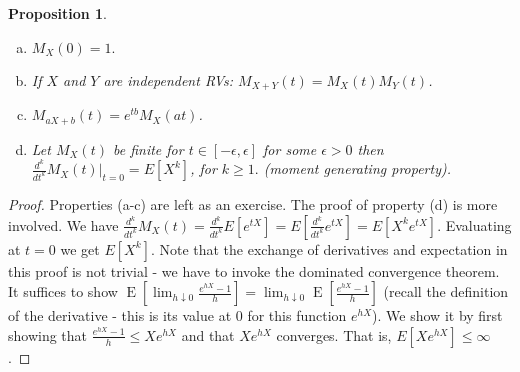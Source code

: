 \documentclass{book}
\theoremstyle{plain}%
\newtheorem{proposition}{Proposition}[section]
\theoremstyle{definition}
\DeclareMathOperator{\E}{E}
\newlength{\arrow}
\begin{document}
\begin{proposition}
\text{ } \newline
\begin{enumerate}[(a)]
\item $M_X(0) = 1.$
\item If $X$ and $Y$ are independent RVs: $M_{X+Y}(t) = M_{X}(t)M_{Y}(t)$.
\item $M_{aX + b}(t) = e^{tb}M_X(at)$.
\item Let $M_X(t)$ be finite for $t \in [-\epsilon, \epsilon]$ for some $\epsilon > 0$ then $\frac{d^k}{dt^k} M_X(t)|_{t=0} = E[X^k]$, for $k \geq 1.$ \textit{(moment generating property)}.
\end{enumerate}\label{prop:mgf}
\end{proposition}

\begin{proof}
Properties (a-c) are left as an exercise. The proof of property (d) is more involved. We have $\frac{d^k}{dt^k} M_X(t) = \frac{d^k}{dt^k} E[e^{tX}] =  E[\frac{d^k}{dt^k}e^{tX}] = E[X^ke^{tX}]$. Evaluating at $t = 0$ we get $E[X^k]$. Note that the exchange of derivatives and expectation in this proof is not trivial - we have to invoke the dominated convergence theorem. It suffices to show $\E[\lim_{h \downarrow 0} \frac{e^{hX} - 1}{h}] = \lim_{h \downarrow 0} \E[\frac{e^{hX} - 1}{h}]$ (recall the definition of the derivative - this is its value at 0 for this function $e^{hX}$). We show it by first showing that $\frac{e^{hX} - 1}{h} \leq Xe^{hX}$ and that $Xe^{hX}$ converges. That is, $E[Xe^{hX}] \leq \infty$.
\end{proof}
\end{document}
